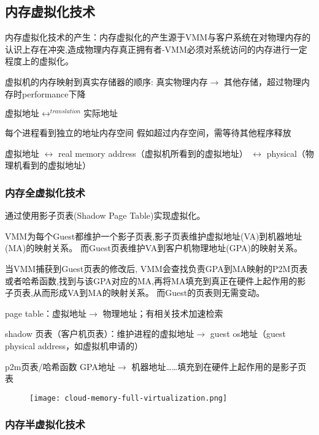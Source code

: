 \subsection{内存虚拟化技术}

内存虚拟化技术的产生：内存虚拟化的产生源于VMM与客户系统在对物理内存的认识上存在冲突,造成物理内存真正拥有者-VMM必须对系统访问的内存进行一定程度上的虚拟化。 

虚拟机的内存映射到真实存储器的顺序: 真实物理内存$\rightarrow$ 其他存储，️超过物理内存时performance下降

$虚拟地址\leftrightarrow^{translation}实际地址$

每个进程看到独立的地址内存空间
假如超过内存空间，需等待其他程序释放

虚拟地址 $\leftrightarrow$ real memory address（虚拟机所看到的虚拟地址） $\leftrightarrow$ physical（物理机看到的虚拟地址）

\subsubsection{内存全虚拟化技术}

通过使用影子页表(Shadow Page Table)实现虚拟化。 

VMM为每个Guest都维护一个影子页表,影子页表维护虚拟地址(VA)到机器地址(MA)的映射关系。 而Guest页表维护VA到客户机物理地址(GPA)的映射关系。 

当VMM捕获到Guest页表的修改后, VMM会查找负责GPA到MA映射的P2M页表或者哈希函数,找到与该GPA对应的MA,再将MA填充到真正在硬件上起作用的影子页表,从而形成VA到MA的映射关系。 而Guest的页表则无需变动。 

page table：虚拟地址$\rightarrow$ 物理地址；有相关技术加速检索

shadow 页表（客户机页表）：维护进程的虚拟地址$\rightarrow$ guest os地址（guest physical address，如虚拟机申请的）

p2m页表/哈希函数 GPA地址$\rightarrow$ 机器地址……填充到在硬件上起作用的是影子页表


\begin{figure}[htbp]
    \begin{center}
        \texttt{[image: cloud-memory-full-virtualization.png]}
    \end{center}
\end{figure}


\subsubsection{内存半虚拟化技术}

